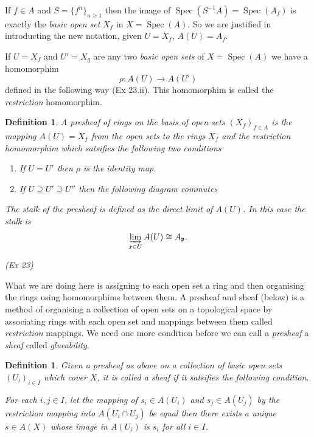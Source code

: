 \documentclass[]{report}
\newtheorem{defn}[theorem]{Definition}
\DeclareMathOperator\Spec{Spec}
\newcommand\byS{S^{-1}}
\newcommand\mfk[1]{\mathfrak{#1}}
\begin{document}
    If $f \in A$ and $S = \{f^n\}_{n\geq1}$ then the image of $\Spec(\byS A) = \Spec(A_f)$ is exactly the \textit{basic open set} $X_f$ in $X = \Spec(A)$. So we are justified in introducting the new notation, given $U = X_f$, $A(U) = A_f$.

    If $U = X_f$ and $U' = X_g$ are any two \textit{basic open sets} of $X = \Spec(A)$ we have a homomorphim 
    $$\rho: A(U) \rightarrow A(U')$$
    defined in the following way (Ex 23.ii). This homomorphim is called the \textit{restriction} homomorphim.

\begin{defn}
    A \textit{presheaf of rings} on the basis of open sets $(X_f)_{f \in A}$ is the mapping $A(U) = X_f$ from the open sets to the rings $X_f$ and the \textit{restriction} homomorphim which satsifies the following two conditions
    \begin{enumerate}
        \item If $U = U'$ then $\rho$ is the identity map.
        \item If $U \supseteq U' \supseteq U''$ then the following diagram commutes 
            \begin{center}
        \end{center}
    \end{enumerate} 

    The stalk of the presheaf is defined as the direct limit of $A(U)$. In this case the stalk is
    $$\varinjlim_{x \in U} A(U) \cong A_\mfk{p}.$$

    (Ex 23)
\end{defn}

What we are doing here is assigning to each open set a ring and then organising the rings using homomorphims between them. A presheaf and sheaf (below) is a method of organising a collection of open sets on a topological space by associating rings with each open set and mappings between them called \textit{restriction} mappings. We need one more condition before we can call a \textit{presheaf} a \textit{sheaf} called \textit{glueability}.

\begin{defn}
    Given a presheaf as above on a collection of basic open sets $(U_i)_{i \in I}$ which cover $X$, it is called a \textit{sheaf} if it satsifies the following condition. 

For each $i,j \in I$, let the mapping of $s_i \in A(U_i)$ and $s_j \in A(U_j)$ by the restriction mapping into $A(U_i \cap U_j)$ be equal then there exists a unique $s \in A(X)$ whose image in $A(U_i)$ is $s_i$ for all $i \in I$. 
\end{defn}
\end{document}
